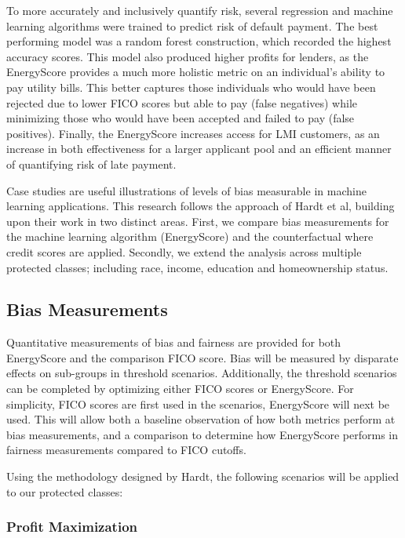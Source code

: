 \documentclass[11pt,]{article}
\begin{document}
To more accurately and inclusively quantify risk, several regression and
machine learning algorithms were trained to predict risk of default
payment. The best performing model was a random forest construction,
which recorded the highest accuracy scores. This model also produced
higher profits for lenders, as the EnergyScore provides a much more
holistic metric on an individual's ability to pay utility bills. This
better captures those individuals who would have been rejected due to
lower FICO scores but able to pay (false negatives) while minimizing
those who would have been accepted and failed to pay (false positives).
Finally, the EnergyScore increases access for LMI customers, as an
increase in both effectiveness for a larger applicant pool and an
efficient manner of quantifying risk of late payment.

Case studies are useful illustrations of levels of bias measurable in
machine learning applications. This research follows the approach of
Hardt et al, building upon their work in two distinct areas. First, we
compare bias measurements for the machine learning algorithm
(EnergyScore) and the counterfactual where credit scores are applied.
Secondly, we extend the analysis across multiple protected classes;
including race, income, education and homeownership status.

\hypertarget{bias-measurements}{%
\subsection{Bias Measurements}\label{bias-measurements}}

Quantitative measurements of bias and fairness are provided for both
EnergyScore and the comparison FICO score. Bias will be measured by
disparate effects on sub-groups in threshold scenarios. Additionally,
the threshold scenarios can be completed by optimizing either FICO
scores or EnergyScore. For simplicity, FICO scores are first used in the
scenarios, EnergyScore will next be used. This will allow both a
baseline observation of how both metrics perform at bias measurements,
and a comparison to determine how EnergyScore performs in fairness
measurements compared to FICO cutoffs.

Using the methodology designed by Hardt, the following scenarios will be
applied to our protected classes:

\hypertarget{profit-maximization}{%
\subsubsection{Profit Maximization}\label{profit-maximization}}
\end{document}
